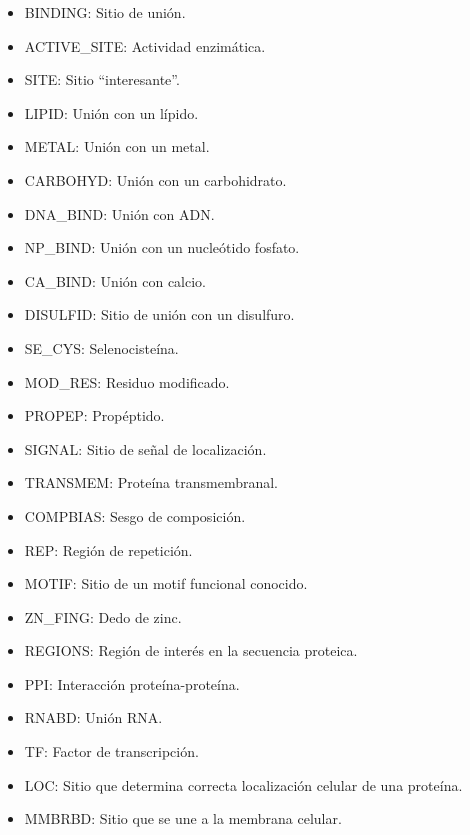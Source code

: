 \begin{itemize}
    \item BINDING: Sitio de unión.
    \item ACTIVE\_SITE: Actividad enzimática. 
    \item SITE: Sitio ``interesante''.
    \item LIPID: Unión con un lípido.
    \item METAL: Unión con un metal.
    \item CARBOHYD: Unión con un carbohidrato.
    \item DNA\_BIND: Unión con ADN.
    \item NP\_BIND: Unión con un nucleótido fosfato.
    \item CA\_BIND: Unión con calcio.
    \item DISULFID: Sitio de unión con un disulfuro.
    \item SE\_CYS: Selenocisteína.
    \item MOD\_RES: Residuo modificado.
    \item PROPEP: Propéptido.
    \item SIGNAL: Sitio de señal de localización.
    \item TRANSMEM: Proteína transmembranal.
    \item COMPBIAS: Sesgo de composición.
    \item REP: Región de repetición.
    \item MOTIF: Sitio de un motif funcional conocido.
    \item ZN\_FING: Dedo de zinc.
    \item REGIONS: Región de interés en la secuencia proteica.
    \item PPI: Interacción proteína-proteína.
    \item RNABD: Unión RNA.
    \item TF: Factor de transcripción. 
    \item LOC: Sitio que determina correcta localización celular de una proteína. 
    \item MMBRBD: Sitio que se une a la membrana celular.
\end{itemize}


